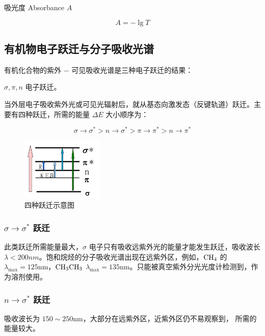 吸光度 Absorbance $A$

\begin{equation}
    A = - \lg T
\end{equation}

\subsection{有机物电子跃迁与分子吸收光谱}

有机化合物的紫外 $-$ 可见吸收光谱是三种电子跃迁的结果：

$\sigma, \pi, n$ 电子跃迁。

当外层电子吸收紫外光或可见光辐射后，就从基态向激发态（反键轨道）跃迁。主要有四种跃迁，所需的能量 $\Delta E$ 大小顺序为：

\begin{equation}
    \sigma \rightarrow \sigma^* > n \rightarrow \sigma^* > \pi \rightarrow \pi^* > n \rightarrow \pi^*
\end{equation}

\begin{figure}[H]
    \centering
    \includegraphics[width=0.35\textwidth]{images/UV-Vis-orbit.png}
    \caption{四种跃迁示意图}
\end{figure}


\subsubsection{$\sigma \rightarrow \sigma^*$ 跃迁}

此类跃迁所需能量最大，$\sigma$ 电子只有吸收远紫外光的能量才能发生跃迁，吸收波长
$\lambda < 200 nm$。饱和烷烃的分子吸收光谱出现在远紫外区，例如，$\ce{CH4}$ 的
$\lambda_{\max} = 125 \mathrm{nm}$，$\ce{CH3CH3}$ $\lambda_{\max} = 135
    \mathrm{nm}$。只能被真空紫外分光光度计检测到，作为溶剂使用。

\subsubsection{$n \rightarrow \sigma^*$ 跃迁}

吸收波长为 $ 150 \sim 250 \mathrm{nm} $，大部分在远紫外区，近紫外区仍不易观察到，
所需的能量较大。

